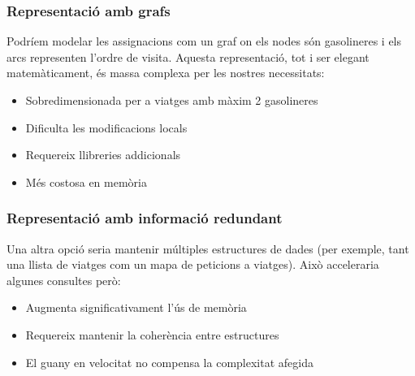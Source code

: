 \vspace{0.5cm}

\subsubsection{Representació amb grafs}

Podríem modelar les assignacions com un graf on els nodes són gasolineres i els arcs representen l'ordre de visita. Aquesta representació, tot i ser elegant matemàticament, és massa complexa per les nostres necessitats:

\begin{itemize}
    \item Sobredimensionada per a viatges amb màxim 2 gasolineres
    \item Dificulta les modificacions locals
    \item Requereix llibreries addicionals
    \item Més costosa en memòria
\end{itemize}

\vspace{0.5cm}

\subsubsection{Representació amb informació redundant}

Una altra opció seria mantenir múltiples estructures de dades (per exemple, tant una llista de viatges com un mapa de peticions a viatges). Això acceleraria algunes consultes però:

\begin{itemize}
    \item Augmenta significativament l'ús de memòria
    \item Requereix mantenir la coherència entre estructures
    \item El guany en velocitat no compensa la complexitat afegida
\end{itemize}
